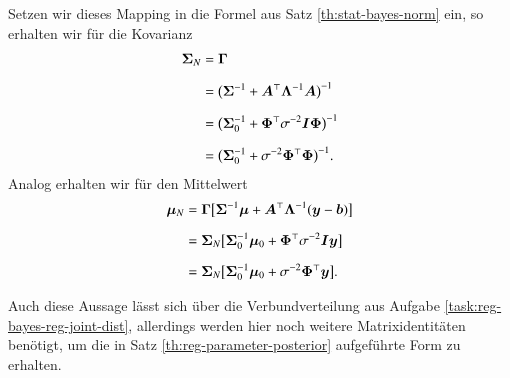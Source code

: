 Setzen wir dieses Mapping in die Formel aus Satz \ref{th:stat-bayes-norm} ein, so erhalten wir für die Kovarianz
\begin{align*}
	\bm{\Sigma}_N
		&= \bm{\Gamma}
\\[2mm]
		&= \bigl( \bm{\Sigma}^{-1} + \bm{A}^\top \bm{\Lambda}^{-1} \bm{A} \bigr)^{-1}
\\[2mm]
		&= \bigl( \bm{\Sigma}_0^{-1} + \bm{\Phi}^\top \sigma^{-2} \bm{I} \bm{\Phi} \bigr)^{-1}
\\[2mm]
		&= \bigl( \bm{\Sigma}_0^{-1} + \sigma^{-2} \bm{\Phi}^\top \bm{\Phi} \bigr)^{-1}.
\end{align*}
Analog erhalten wir für den Mittelwert
\begin{align*}
	\bm{\mu}_N
		&= \bm{\Gamma} \bigl[ \bm{\Sigma}^{-1} \bm{\mu} + \bm{A}^\top \bm{\Lambda}^{-1} (\bm{y} - \bm{b}) \bigr]
\\[2mm]
		&= \bm{\Sigma}_N \bigl[ \bm{\Sigma}_0^{-1} \bm{\mu}_0 + \bm{\Phi}^\top \sigma^{-2} \bm{I} \bm{y} \bigr]
\\[2mm]
		&= \bm{\Sigma}_N \bigl[ \bm{\Sigma}_0^{-1} \bm{\mu}_0 + \sigma^{-2} \bm{\Phi}^\top \bm{y} \bigr].
\end{align*}

Auch diese Aussage lässt sich über die Verbundverteilung aus Aufgabe \ref{task:reg-bayes-reg-joint-dist}, allerdings werden hier noch weitere Matrixidentitäten benötigt, um die in Satz \ref{th:reg-parameter-posterior} aufgeführte Form zu erhalten.


\newpage